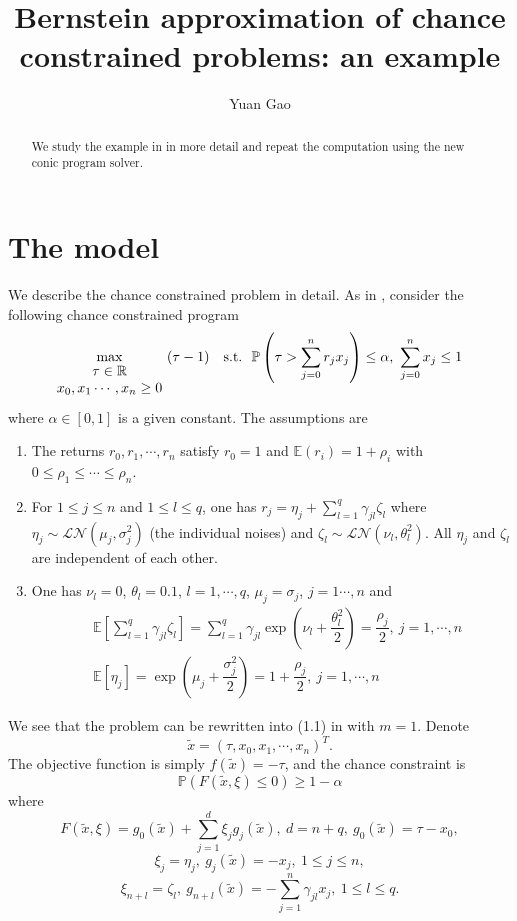 \documentclass[11pt]{article}
\title{Bernstein approximation of chance constrained problems: an example}
\author{Yuan Gao}
\begin{document}
\maketitle

\begin{abstract}
We study the example in\cite{Nemirovsky_and_Shapiro} in more detail and repeat the computation using the new conic program solver.
\end{abstract}

\section*{The model}
We describe the chance constrained problem in detail. As in \cite{Nemirovsky_and_Shapiro}, consider the following chance constrained program
\begin{align} \label{investment_problem}
\max_{\begin{matrix}
	\tau \in \mathbb{R}\\ 	
	x_0, x_1\cdots,x_n \geq 0
	\end{matrix}}\ (\tau - 1)\ \ \ \textnormal{s.t.}\ \ \mathbb{P} \left(\tau > \sum_{j=0}^n r_j x_j \right) \leq \alpha,\ \sum_{j=0}^{n} x_j \leq 1
\end{align}
where $\alpha \in [0,1]$ is a given constant. The assumptions are 
\begin{enumerate}
	\item The returns $r_0, r_1, \cdots, r_n$ satisfy $r_0=1$ and $\mathbb{E}(r_i) = 1 + \rho_i$ with $0\leq \rho_1 \leq \cdots \leq \rho_n$.
	\item For $1\leq j \leq n$ and $1\leq l \leq q$, one has $r_j = \eta_j + \sum_{l=1}^q \gamma_{jl}\zeta_l$ where $\eta_j \sim \mathcal{LN}(\mu_j, \sigma_j^2)$ (the individual noises) and $\zeta_l \sim \mathcal{LN}(\nu_l, \theta_l^2)$. All $\eta_j$ and $\zeta_l$ are independent of each other.
	\item One has $\nu_l = 0$, $\theta_l=0.1$, $l=1,\cdots, q$,
    $\mu_j = \sigma_j$, $j=1\cdots, n$ and
    \begin{align*}
    &\mathbb{E}\left[\sum_{l=1}^q \gamma_{jl} \zeta_l\right] =  \sum_{l=1}^q \gamma_{jl} \exp \left(\nu_l + \dfrac{\theta_l^2}{2}\right) = \dfrac{\rho_j}{2},\ j = 1, \cdots, n\\
    &\mathbb{E}\left[\eta_j\right] = \exp\left(\mu_j + \dfrac{\sigma_j^2}{2}\right) = 1 + \dfrac{\rho_j}{2},\ j =1,\cdots, n
    \end{align*}
\end{enumerate}
We see that the problem can be rewritten into (1.1) in \cite{Nemirovsky_and_Shapiro} with $m=1$. Denote \[\tilde{x} = (\tau, x_0, x_1, \cdots, x_n)^T.\] The objective function is simply $f(\tilde{x}) = -\tau$, and the chance constraint is \[\mathbb{P}\left(F(\tilde{x}, \xi) \leq 0 \right) \geq 1-\alpha\] where \[F(\tilde{x},\xi) =g_0(\tilde{x}) + \sum_{j=1}^d \xi_j g_j(\tilde{x}),\ d = n+q,\ g_0(\tilde{x}) = \tau - x_0,\]
\[\xi_j = \eta_j,\ g_j(\tilde{x}) = -x_j,\ 1\leq j \leq n,\] \[\xi_{n+l} = \zeta_l,\ g_{n+l}(\tilde{x}) = -\sum_{j=1}^n \gamma_{jl}x_j,\ 1\leq l \leq q.\]
\end{document}
